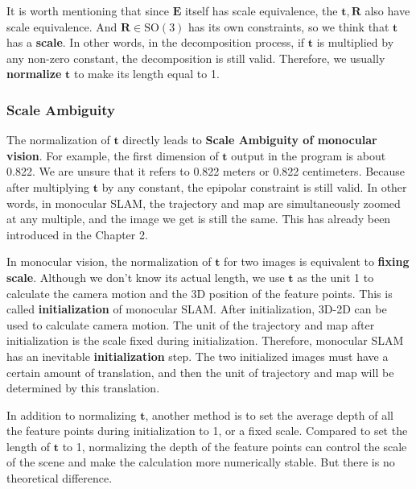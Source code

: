 It is worth mentioning that since $\bm{E}$ itself has scale equivalence, the $\bm{t}, \bm{R}$ also have scale equivalence. And $\bm{R} \in \mathrm{SO}(3)$ has its own constraints, so we think that $\bm{t}$ has a \textbf{scale}. In other words, in the decomposition process, if $\bm{t}$ is multiplied by any non-zero constant, the decomposition is still valid. Therefore, we usually \textbf{normalize} $\bm{t}$ to make its length equal to 1.

\subsubsection{Scale Ambiguity}
The normalization of $\bm{t}$ directly leads to \textbf{Scale Ambiguity of monocular vision}. For example, the first dimension of $\bm{t}$ output in the program is about 0.822. We are unsure that it refers to 0.822 meters or 0.822 centimeters. Because after multiplying $\bm{t}$ by any constant, the epipolar constraint is still valid. In other words, in monocular SLAM, the trajectory and map are simultaneously zoomed at any multiple, and the image we get is still the same. This has already been introduced in the Chapter 2.

In monocular vision, the normalization of $\bm{t}$ for two images is equivalent to \textbf{fixing scale}. Although we don't know its actual length, we use $\bm{t}$ as the unit 1 to calculate the camera motion and the 3D position of the feature points. This is called \textbf{initialization} of monocular SLAM. After initialization, 3D-2D can be used to calculate camera motion. The unit of the trajectory and map after initialization is the scale fixed during initialization. Therefore, monocular SLAM has an inevitable \textbf{initialization} step. The two initialized images must have a certain amount of translation, and then the unit of trajectory and map will be determined by this translation.

In addition to normalizing $\bm{t}$, another method is to set the average depth of all the feature points during initialization to 1, or a fixed scale. Compared to set the length of $\bm{t}$ to 1, normalizing the depth of the feature points can control the scale of the scene and make the calculation more numerically stable. But there is no theoretical difference.

